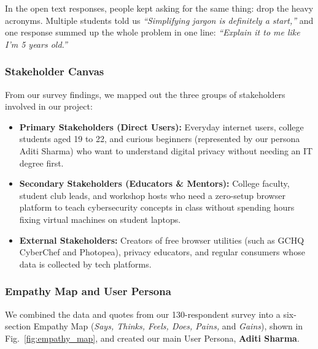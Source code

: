 \documentclass[11pt,a4paper]{article}
\begin{document}
In the open text responses, people kept asking for the same thing: drop the heavy acronyms. Multiple students told us \textit{``Simplifying jargon is definitely a start,''} and one response summed up the whole problem in one line: \textit{``Explain it to me like I'm 5 years old.''}

\subsubsection{Stakeholder Canvas}
From our survey findings, we mapped out the three groups of stakeholders involved in our project:
\begin{itemize}
    \item \textbf{Primary Stakeholders (Direct Users):} Everyday internet users, college students aged 19 to 22, and curious beginners (represented by our persona Aditi Sharma) who want to understand digital privacy without needing an IT degree first.
    \item \textbf{Secondary Stakeholders (Educators \& Mentors):} College faculty, student club leads, and workshop hosts who need a zero-setup browser platform to teach cybersecurity concepts in class without spending hours fixing virtual machines on student laptops.
    \item \textbf{External Stakeholders:} Creators of free browser utilities (such as GCHQ CyberChef and Photopea), privacy educators, and regular consumers whose data is collected by tech platforms.
\end{itemize}

\subsubsection{Empathy Map and User Persona}
We combined the data and quotes from our 130-respondent survey into a six-section Empathy Map (\textit{Says, Thinks, Feels, Does, Pains,} and \textit{Gains}), shown in Fig.~\ref{fig:empathy_map}, and created our main User Persona, \textbf{Aditi Sharma}.
\end{document}
